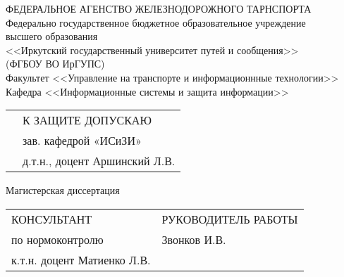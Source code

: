 \begin{titlepage}
	\changefontsizes[14pt]{14pt}
	\newpage
	\begin{center}
		ФЕДЕРАЛЬНОЕ АГЕНСТВО ЖЕЛЕЗНОДОРОЖНОГО ТАРНСПОРТА \\
		\vspace{14pt}
		Федерально государственное бюджетное образовательное учреждение \\ высшего образования \\
		<<Иркутский государственный университет путей и сообщения>> \\
		(ФГБОУ ВО ИрГУПС) \\
		\vspace{21pt}
		Факультет <<Управление на транспорте и информационнные технологии>> \\
		Кафедра <<Информационные системы и защита информации>>
	\end{center}
	\vspace{28pt}
	\begin{flushleft}
		\begin{tabular}{p{}l}
								&  К ЗАЩИТЕ ДОПУСКАЮ				\\ [7pt]
								&  	зав. кафедрой «ИСиЗИ»			\\
								&  	д.т.н., доцент Аршинский Л.В.	\\
		\end{tabular}
	\end{flushleft}
	\vspace{28pt}
	\begin{center}
		\MakeUppercase{\kurtitle}
	\end{center}
	\vspace{-7pt}
	\begin{center}
		Магистерская диссертация \\
	\vspace{14pt}
		\mytitle
	\end{center}
	\vspace{35pt}
	\begin{flushleft}
		\begin{tabular}{p{0.47\textwidth}l}
			КОНСУЛЬТАНТ					&  РУКОВОДИТЕЛЬ РАБОТЫ		\\ [7pt]
			по нормоконтролю			&  Звонков И.В.		\\
			к.т.н. доцент Матиенко Л.В.	&  							\\
		\end{tabular}
	\end{flushleft}
	\vspace{35pt}
	\begin{flushleft}

\end{flushleft}
\end{titlepage}
